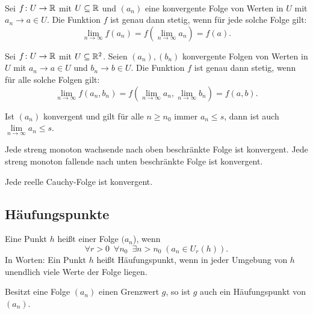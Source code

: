 \minisection{}\\
Sei $f\colon U\to\mathbb R$ mit $U\subseteq\mathbb R$ und $(a_n)$ eine konvergente
Folge von Werten in $U$ mit $a_n\to a\in U$.
Die Funktion $f$ ist genau dann stetig, wenn für jede solche
Folge gilt:
\begin{equation}
\lim_{n\to\infty} f(a_n) = f(\lim_{n\to\infty} a_n) = f(a).
\end{equation}

\noindent
Sei $f\colon U\to\mathbb R$ mit $U\subseteq\mathbb R^2$.
Seien $(a_n),(b_n)$ konvergente Folgen von Werten in $U$ mit
$a_n\to a\in U$ und $b_n\to b\in U$. Die Funktion $f$ ist genau dann
stetig, wenn für alle solche Folgen gilt:
\begin{equation}
\lim_{n\to\infty} f(a_n,b_n)
= f(\lim_{n\to\infty}a_n,\lim_{n\to\infty} b_n)
= f(a,b).
\end{equation}

\noindent
{}
Ist $(a_n)$ konvergent und gilt für alle $n\ge n_0$ immer $a_n\le s$,
dann ist auch $\lim\limits_{n\to\infty} a_n\le s$.

\minisection{}
Jede streng monoton wachsende nach oben beschränkte Folge ist
konvergent. Jede streng monoton fallende nach unten beschränkte
Folge ist konvergent.

\minisection{}
Jede reelle Cauchy-Folge ist konvergent.


\subsection{Häufungspunkte}
\begin{definition}[Häufungspunkt]\mbox{}\newline
Eine Punkt $h$ heißt  einer Folge $(a_n$), wenn
\begin{equation}
\forall r{>}0\enspace\forall n_0\enspace\exists n{>}n_0\;
(a_n\in U_r(h)).
\end{equation}
In Worten: Ein Punkt $h$ heißt Häufungspunkt, wenn in jeder Umgebung
von $h$ unendlich viele Werte der Folge liegen.
\end{definition}

\noindent
Besitzt eine Folge $(a_n)$ einen Grenzwert $g$, so ist $g$ auch ein
Häufungspunkt von $(a_n)$.

